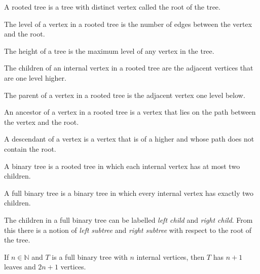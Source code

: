         \begin{definition}
            A rooted tree is a tree with distinct vertex
            called the root of the tree.
        \end{definition}
        \begin{definition}
            The level of a vertex in a rooted tree is the number
            of edges between the vertex and the root.
        \end{definition}
        \begin{definition}
            The height of a tree is the maximum level of any
            vertex in the tree.
        \end{definition}
        \begin{definition}
            The children of an internal vertex in a rooted tree
            are the adjacent vertices that are one level
            higher.
        \end{definition}
        \begin{definition}
            The parent of a vertex in a rooted tree is
            the adjacent vertex one level below.
        \end{definition}
        \begin{definition}
            An ancestor of a vertex in a rooted tree is a vertex
            that lies on the path between the vertex and the root.
        \end{definition}
        \begin{definition}
            A descendant of a vertex is a vertex that is of a higher
            and whose path does not contain the root.
        \end{definition}
        \begin{definition}
            A binary tree is a rooted tree in which each internal
            vertex has at most two children.
        \end{definition}
        \begin{definition}
            A full binary tree is a binary tree in which every
            internal vertex has exactly two children.
        \end{definition}
        The children in a full binary tree can be labelled
        \textit{left child} and \textit{right child}. From this there is a
        notion of \textit{left subtree} and \textit{right subtree} with
        respect to the root of the tree.
        \begin{theorem}
            If $n\in\mathbb{N}$ and $T$ is a full binary tree with
            $n$ internal vertices,
            then $T$ has $n+1$ leaves and $2n+1$ vertices.
        \end{theorem}
